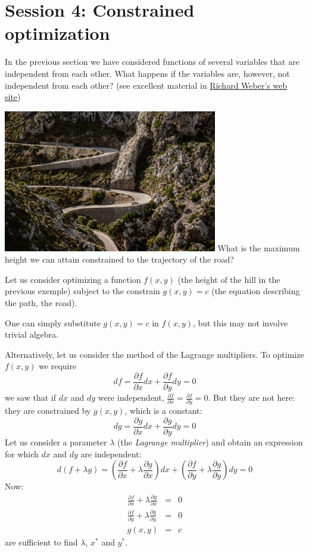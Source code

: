 
\section{Session 4: Constrained optimization}
In the previous section we have considered functions of several variables that are independent from each other. What happens if the variables are, however, not independent from each other? (see excellent material in \href{https://www.statslab.cam.ac.uk/~rrw1/}{Richard Weber's web site})

  \begin{center}
    \includegraphics[width=0.7\textwidth]{../figures/mallorca.jpg}\newline
    What is the maximum height we can attain constrained to the trajectory of the road?
  \end{center}

  Let us consider optimizing a function $f(x,y)$ (the height of the hill in the previous exemple) subject to the constrain $g(x,y)=c$ (the equation describing the path, the road).

  One can simply substitute $g(x,y)=c$ in $f(x,y)$, but this may not involve trivial algebra.

  Alternatively, let us consider the method of the Lagrange multipliers. To optimize $f(x,y)$ we require
  \[
    df=\frac{\partial f}{\partial x} dx +\frac{\partial f}{\partial y}dy=0
  \]
  we saw that if $dx$ and $dy$ were independent, $\frac{\partial f}{\partial x}=\frac{\partial f}{\partial y}=0$. But they are not here: they are constrained by $g(x,y)$, which is a constant:
  \[
    dg=\frac{\partial g}{\partial x} dx +\frac{\partial g}{\partial y}dy=0
  \]
  Let us consider a parameter $\lambda$ (the {\it Lagrange multiplier}) and obtain an expression for which $dx$ and $dy$ are independent:
  \[
    d(f+\lambda g)=(\frac{\partial f}{\partial x}+\lambda \frac{\partial g}{\partial x}) dx +(\frac{\partial f}{\partial y}+\lambda \frac{\partial g}{\partial y})dy=0
  \]
  Now:
  \begin{eqnarray*}
    \frac{\partial f}{\partial x}+\lambda \frac{\partial g}{\partial x} &=&0\\
    \frac{\partial f}{\partial y}+\lambda \frac{\partial g}{\partial y} &=&0\\
    g(x,y)&=&c
  \end{eqnarray*}
  are sufficient to find $\lambda$, $x^*$ and $y^*$.

